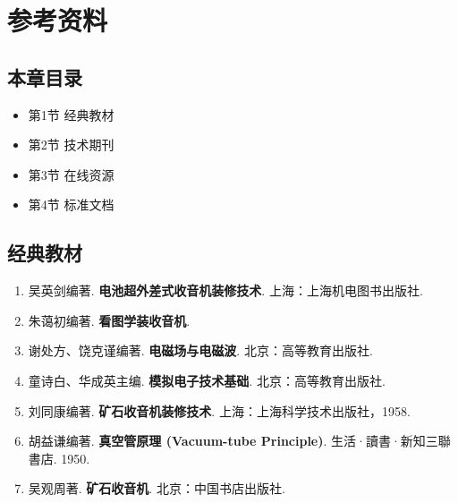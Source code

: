 
\chapter{参考资料}
\label{chap:references}

\section{本章目录}
\begin{itemize}
    \item 第1节 经典教材
    \item 第2节 技术期刊
    \item 第3节 在线资源
    \item 第4节 标准文档
\end{itemize}

\section{经典教材}

\begin{enumerate}
    \item 吴英剑编著. \textbf{电池超外差式收音机装修技术}. 上海：上海机电图书出版社.
    \item 朱蔼初编著. \textbf{看图学装收音机}.
    \item 谢处方、饶克谨编著. \textbf{电磁场与电磁波}. 北京：高等教育出版社.
    \item 童诗白、华成英主编. \textbf{模拟电子技术基础}. 北京：高等教育出版社.
    \item 刘同康编著. \textbf{矿石收音机装修技术}. 上海：上海科学技术出版社，1958.
    \item 胡益谦编著. \textbf{真空管原理 (Vacuum-tube Principle)}. 生活·讀書·新知三聯書店. 1950.
    \item 吴观周著. \textbf{矿石收音机}. 北京：中国书店出版社.
\end{enumerate}

